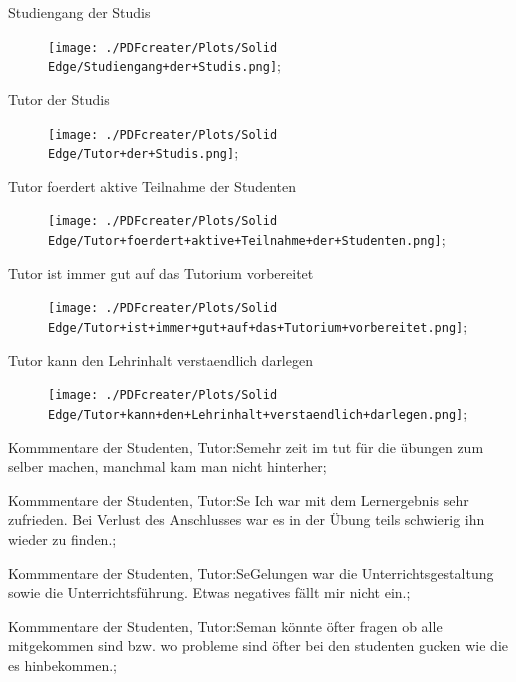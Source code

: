 \documentclass[10pt]{beamer}
\begin{document}
\begin{frame}[fragile]{Studiengang der Studis} 
 \begin{figure}
 \texttt{[image: ./PDFcreater/Plots/Solid Edge/Studiengang+der+Studis.png]};
 \end{figure}
 \end{frame}
\begin{frame}[fragile]{Tutor der Studis} 
 \begin{figure}
 \texttt{[image: ./PDFcreater/Plots/Solid Edge/Tutor+der+Studis.png]};
 \end{figure}
 \end{frame}
\begin{frame}[fragile]{Tutor foerdert aktive Teilnahme der Studenten} 
 \begin{figure}
 \texttt{[image: ./PDFcreater/Plots/Solid Edge/Tutor+foerdert+aktive+Teilnahme+der+Studenten.png]};
 \end{figure}
 \end{frame}
\begin{frame}[fragile]{Tutor ist immer gut auf das Tutorium vorbereitet} 
 \begin{figure}
 \texttt{[image: ./PDFcreater/Plots/Solid Edge/Tutor+ist+immer+gut+auf+das+Tutorium+vorbereitet.png]};
 \end{figure}
 \end{frame}
\begin{frame}[fragile]{Tutor kann den Lehrinhalt verstaendlich darlegen} 
 \begin{figure}
 \texttt{[image: ./PDFcreater/Plots/Solid Edge/Tutor+kann+den+Lehrinhalt+verstaendlich+darlegen.png]};
 \end{figure}
 \end{frame}
\begin{frame}[fragile]{Kommmentare der Studenten, Tutor:Se}mehr zeit im tut für die übungen zum selber machen, manchmal kam man nicht hinterher;
 \end{frame}
\begin{frame}[fragile]{Kommmentare der Studenten, Tutor:Se} Ich war mit dem Lernergebnis sehr zufrieden.   Bei Verlust des Anschlusses war es in der Übung teils schwierig ihn wieder zu finden.;
 \end{frame}
\begin{frame}[fragile]{Kommmentare der Studenten, Tutor:Se}Gelungen war die Unterrichtsgestaltung sowie die Unterrichtsführung. Etwas negatives fällt mir nicht ein.;
 \end{frame}
\begin{frame}[fragile]{Kommmentare der Studenten, Tutor:Se}man könnte öfter fragen ob alle mitgekommen sind bzw. wo probleme sind    öfter bei den studenten gucken wie die es hinbekommen.;
 \end{frame}
\end{document}
